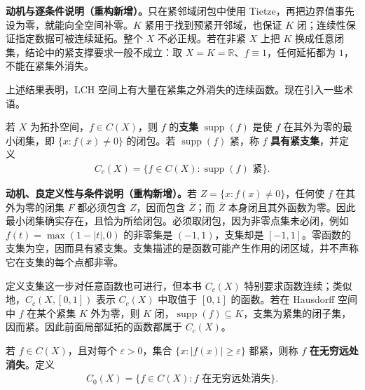 \documentclass[../../main.tex]{subfiles}%
\begin{document}
\begin{remark}
\textbf{动机与逐条件说明（重构新增）。}只在紧邻域闭包中使用 Tietze，再把边界值事先设为零，就能向全空间补零。$K$ 紧用于找到预紧开邻域，也保证 $K$ 闭；连续性保证指定数据可被连续延拓。整个 $X$ 不必正规。若在非紧 $X$ 上把 $K$ 换成任意闭集，结论中的紧支撑要求一般不成立：取 $X=K=\mathbb R$、$f\equiv1$，任何延拓都为 $1$，不能在紧集外消失。
\end{remark}
上述结果表明，LCH 空间上有大量在紧集之外消失的连续函数。现在引入一些术语。
\begin{definition}[支集与紧支集函数]\label{definition:ch04-function-support}
若 $X$ 为拓扑空间，$f\in C(X)$，则 $f$ 的\textbf{支集} $\operatorname{supp}(f)$ 是使 $f$ 在其外为零的最小闭集，即 $\{x:f(x)\ne0\}$ 的闭包。若 $\operatorname{supp}(f)$ 紧，称 $f$ \textbf{具有紧支集}，并定义
\begin{align*}
C_c(X)=\{f\in C(X):\operatorname{supp}(f)\text{ 紧}\}.
\end{align*}
\end{definition}
\begin{remark}
\textbf{动机、良定义性与条件说明（重构新增）。}若 $Z=\{x:f(x)\ne0\}$，任何使 $f$ 在其外为零的闭集 $F$ 都必须包含 $Z$，因而包含 $\overline Z$；而 $\overline Z$ 本身闭且其外函数为零。因此最小闭集确实存在，且恰为所给闭包。必须取闭包，因为非零点集未必闭，例如 $f(t)=\max(1-|t|,0)$ 的非零集是 $(-1,1)$，支集却是 $[-1,1]$。零函数的支集为空，因而具有紧支集。支集描述的是函数可能产生作用的闭区域，并不声称它在支集的每个点都非零。

定义支集这一步对任意函数也可进行，但本书 $C_c(X)$ 特别要求函数连续；类似地，$C_c(X,[0,1])$ 表示 $C_c(X)$ 中取值于 $[0,1]$ 的函数。若在 Hausdorff 空间中 $f$ 在某个紧集 $K$ 外为零，则 $K$ 闭，$\operatorname{supp}(f)\subseteq K$，支集为紧集的闭子集，因而紧。因此前面局部延拓的函数都属于 $C_c(X)$。
\end{remark}
\begin{definition}[在无穷远处消失]\label{definition:ch04-vanishing-at-infinity}
若 $f\in C(X)$，且对每个 $\varepsilon>0$，集合 $\{x:|f(x)|\ge\varepsilon\}$ 都紧，则称 $f$ \textbf{在无穷远处消失}。定义
\begin{align*}
C_0(X)=\{f\in C(X):f\text{ 在无穷远处消失}\}.
\end{align*}
\end{definition}
\end{document}
